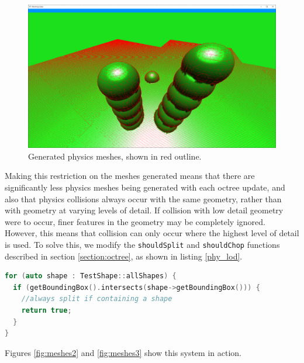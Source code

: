 \documentclass[11pt]{article}
\begin{document}
\begin{figure}[H]
  \includegraphics[width=\textwidth]{meshes1.png}
  \caption{Generated physics meshes, shown in red outline.}
  \label{fig:meshes1}
\end{figure}

Making this restriction on the meshes generated means that there are significantly less physics meshes being generated with each octree update, and also that physics collisions always occur with the same geometry, rather than with geometry at varying levels of detail. If collision with low detail geometry were to occur, finer features in the geometry may be completely ignored. However, this means that collision can only occur where the highest level of detail is used. To solve this, we modify the \texttt{shouldSplit} and \texttt{shouldChop} functions described in section \ref{section:octree}, as shown in listing \ref{phy_lod}.
\pagebreak
\begin{lstlisting}[language=C++,label={phy_lod},caption={Snippet from \texttt{shouldSplit} responsible for increasing the level of detail near a set of test objects. All chunks with bounding boxes that intersect the bounding box of a physics shape will be split until the highest detail level is reached. The octree refinement process described in section \ref{section:octree_refinement} ensures that this does not create any places where different levels of detail are adjacent to each other.}]
for (auto shape : TestShape::allShapes) {
  if (getBoundingBox().intersects(shape->getBoundingBox())) {
    //always split if containing a shape
    return true;
  }
}
\end{lstlisting}

Figures \ref{fig:meshes2} and \ref{fig:meshes3} show this system in action.
\end{document}
